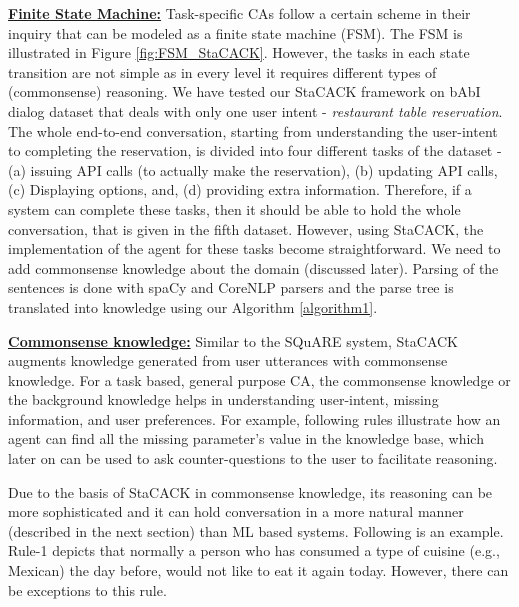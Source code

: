 \documentclass[letterpaper]{article}
\begin{document}
\noindent\textbf{\underline{Finite State Machine:}}
Task-specific CAs follow a certain scheme in their inquiry that can be modeled as a finite state machine (FSM).
The FSM is illustrated in Figure \ref{fig:FSM_StaCACK}. However, the tasks in each state transition are not simple as in every level it requires different types of (commonsense) reasoning. We have tested our StaCACK framework on bAbI dialog dataset that deals with only one user intent - \textit{restaurant table reservation}. The whole end-to-end conversation, starting from understanding the user-intent to completing the reservation, is divided into four different tasks of the dataset - (a) issuing API calls (to actually make the reservation), (b) updating API calls, (c) Displaying options, and, (d) providing extra information. Therefore, if a system can complete these tasks, then it should be able to hold the whole conversation, that is given in the fifth dataset. However, using StaCACK, the implementation of the agent for these tasks become straightforward. We need to add commonsense knowledge about the domain (discussed later). Parsing of the sentences is done with spaCy and CoreNLP parsers and the parse tree is translated into knowledge using our Algorithm \ref{algorithm1}.

\noindent\textbf{\underline{Commonsense knowledge:}}
Similar to the SQuARE system, StaCACK augments knowledge generated from user utterances with commonsense knowledge. For a task based, general purpose CA, the commonsense knowledge or the background knowledge helps in understanding user-intent, missing information, and user preferences. For example, following rules illustrate how an agent can find all the missing parameter's value in the knowledge base, which later on can be used to ask counter-questions to the user to facilitate reasoning.

\noindent
\cprotect {}

Due to the basis of StaCACK in commonsense knowledge, its reasoning can be more sophisticated and it can hold  conversation in a more natural manner (described in the next section) than ML based systems. Following is an example. Rule-1 depicts that normally a person who has consumed a type of cuisine (e.g., Mexican) the day before, would not like to eat it again today. However, there can be exceptions to this rule.
\end{document}
